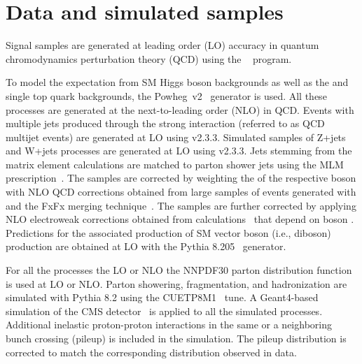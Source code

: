 \section{Data and simulated samples}\label{sec:datasets}
%
%
%


Signal samples are generated at leading order (LO) accuracy in quantum chromodynamics perturbation theory (QCD) using the ~\cite{amcatnlo} program.
%


To model the expectation from SM Higgs boson backgrounds as well as the \ttbar and single top quark backgrounds, the {\sc Powheg~v2}~\cite{Nason:2004rx,Frixione:2007vw,Alioli:2010xd} generator is used. All these processes are generated at the next-to-leading order (NLO) in QCD.
% 
Events with multiple jets produced through the strong interaction (referred to as QCD multijet events) are generated at LO using  v2.3.3.
%
Simulated samples of Z+jets and W+jets processes are generated at LO using  v2.3.3. Jets stemming from the matrix element calculations are matched to parton shower jets using the MLM prescription~\cite{mlm}.
%
The samples are corrected by weighting the \pt of the respective boson with NLO QCD corrections obtained from large samples of events generated with  and the FxFx merging technique~\cite{fxfx}.
%
The samples are further corrected by applying NLO electroweak corrections obtained from calculations~\cite{Kuhn:2005gv,Kallweit:2015fta,Kallweit:2015dum} that depend on boson \pt.
%
Predictions for the associated production of SM vector boson (i.e., diboson) production are obtained at LO with the {\sc Pythia 8.205}~\cite{Sjostrand:2014zea} generator.
%


For all the processes the LO or NLO the NNPDF30 parton distribution function~\cite{Ball:2014uwa} is used at LO or NLO. 
%
Parton showering, fragmentation, and hadronization are simulated with {\sc Pythia 8.2} using the CUETP8M1~\cite{ue1,ue2} tune. 
%
A {\sc Geant4}-based simulation of the CMS detector~\cite{geant4} is applied to all the simulated processes. 
%
Additional inelastic proton-proton interactions in the same or a neighboring bunch crossing (pileup) is included in the simulation.
%
The pileup distribution is corrected to match the corresponding distribution observed in data. 
